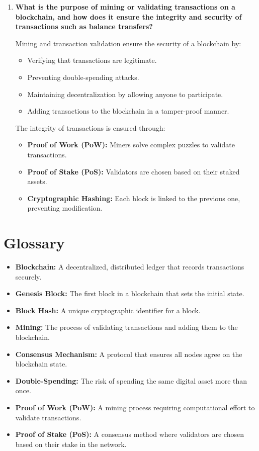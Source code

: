 \documentclass[11pt]{article}
\begin{document}
\begin{enumerate}
    \item \textbf{What is the purpose of mining or validating transactions on a blockchain, and how does it ensure the integrity and security of transactions such as balance transfers?}
    
    Mining and transaction validation ensure the security of a blockchain by:
    \begin{itemize}
        \item Verifying that transactions are legitimate.
        \item Preventing double-spending attacks.
        \item Maintaining decentralization by allowing anyone to participate.
        \item Adding transactions to the blockchain in a tamper-proof manner.
    \end{itemize}
    
    The integrity of transactions is ensured through:
    \begin{itemize}
        \item \textbf{Proof of Work (PoW):} Miners solve complex puzzles to validate transactions.
        \item \textbf{Proof of Stake (PoS):} Validators are chosen based on their staked assets.
        \item \textbf{Cryptographic Hashing:} Each block is linked to the previous one, preventing modification.
    \end{itemize}

\end{enumerate}

\section{Glossary}

\begin{itemize}
    \item \textbf{Blockchain:} A decentralized, distributed ledger that records transactions securely.
    \item \textbf{Genesis Block:} The first block in a blockchain that sets the initial state.
    \item \textbf{Block Hash:} A unique cryptographic identifier for a block.
    \item \textbf{Mining:} The process of validating transactions and adding them to the blockchain.
    \item \textbf{Consensus Mechanism:} A protocol that ensures all nodes agree on the blockchain state.
    \item \textbf{Double-Spending:} The risk of spending the same digital asset more than once.
    \item \textbf{Proof of Work (PoW):} A mining process requiring computational effort to validate transactions.
    \item \textbf{Proof of Stake (PoS):} A consensus method where validators are chosen based on their stake in the network.
\end{itemize}
\end{document}
